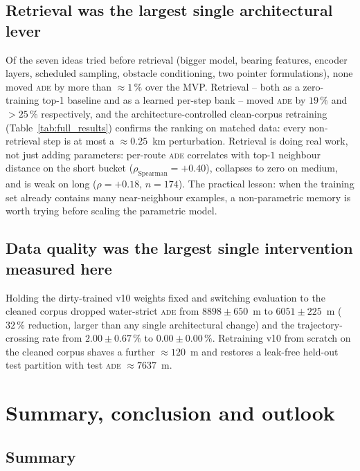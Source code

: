 \documentclass[oneside, a4paper, onecolumn, 11pt]{article}
\newcommand{\ade}{\textsc{ade}}
\begin{document}
\subsection{Retrieval was the largest single architectural lever}
\label{sec:retrievallesson}

Of the seven ideas tried before retrieval (bigger model, bearing
features, encoder layers, scheduled sampling, obstacle conditioning,
two pointer formulations), none moved \ade{} by more than
$\approx 1\,\%$ over the MVP.  Retrieval -- both as a zero-training
top-1 baseline and as a learned per-step bank -- moved \ade{} by
$19\,\%$ and $>25\,\%$ respectively, and the architecture-controlled
clean-corpus retraining (Table~\ref{tab:full_results}) confirms the
ranking on matched data: every non-retrieval step is at most a
$\approx 0.25$~km perturbation.  Retrieval is doing real work, not
just adding parameters: per-route \ade{} correlates with top-$1$
neighbour distance on the short bucket ($\rho_{\mathrm{Spearman}} =
+0.40$), collapses to zero on medium, and is weak on long
($\rho = +0.18$, $n=174$).  The practical lesson: when the training
set already contains many near-neighbour examples, a non-parametric
memory is worth trying before scaling the parametric model.

\subsection{Data quality was the largest single intervention measured here}
\label{sec:dataquality}

Holding the dirty-trained v10 weights fixed and switching evaluation
to the cleaned corpus dropped water-strict \ade{} from
$8898 \pm 650$~m to $6051 \pm 225$~m ($32\,\%$ reduction, larger than
any single architectural change) and the trajectory-crossing rate
from $2.00 \pm 0.67\,\%$ to $0.00 \pm 0.00\,\%$.  Retraining v10
from scratch on the cleaned corpus shaves a further $\approx 120$~m
and restores a leak-free held-out test partition with test \ade{}
$\approx 7637$~m.

\section{Summary, conclusion and outlook}\label{sec:conclusion}

\subsection{Summary}
\end{document}
